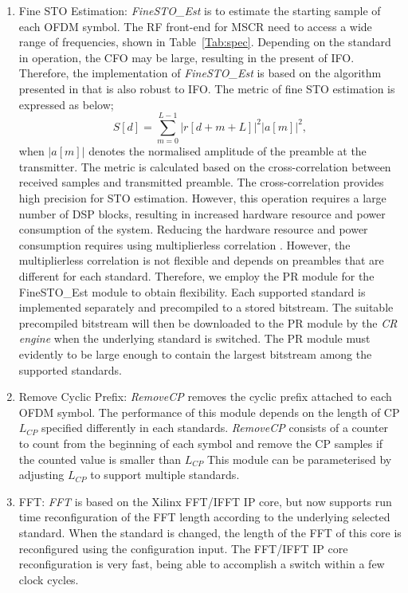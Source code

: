 \begin{enumerate}
\item{Fine STO Estimation:}
\emph{FineSTO\_Est} is to estimate the starting sample of each OFDM symbol. 
The RF front-end for MSCR need to access a wide range of frequencies, shown in Table~\ref{Tab:spec}. Depending on the standard in operation, the CFO may be large, resulting in the present of IFO.
Therefore, the implementation of \emph{FineSTO\_Est} is based on the algorithm presented in \cite{Pham2014} that is also robust to IFO.
The metric of fine STO estimation is expressed as below;
\begin{equation}
\label{ProposedR}
S[d] =\sum_{m =0}^{L-1}   |r[d+m+L]|^2  |a[m]|^2,
\end{equation}
when $|a[m]|$ denotes the normalised amplitude of the preamble at the transmitter.
The metric is calculated based on the cross-correlation between received samples and transmitted preamble.
The cross-correlation provides high precision for STO estimation. 
However, this operation requires a large number of DSP blocks, resulting in increased hardware resource and power consumption of the system.
Reducing the hardware resource and power consumption requires using multiplierless correlation \cite{Pham2012}.
However, the multiplierless correlation is not flexible and depends on preambles that are different for each standard.
Therefore, we employ the PR module for the {FineSTO\_Est} module to obtain flexibility.
Each supported standard is implemented separately and precompiled to a stored bitstream.
The suitable precompiled bitstream will then be downloaded to the PR module by the \emph{CR engine} when the underlying standard is switched.
The PR module must evidently to be large enough to contain the largest bitstream among the supported standards.

\item{Remove Cyclic Prefix:}
\emph{RemoveCP} removes the cyclic prefix attached to each OFDM symbol.
The performance of this module depends on the length of CP $L_{CP}$ specified differently in each standards.
\emph{RemoveCP} consists of a counter to count from the beginning of each symbol and remove the CP samples if the counted value is smaller than $L_{CP}$
This module can be parameterised by adjusting $L_{CP}$ to support multiple standards.

\item{FFT:}
\emph{FFT} is based on the Xilinx FFT/IFFT IP core, but now supports run time reconfiguration of the FFT length according to the underlying selected standard. When the standard is changed, the length of the FFT of this core is reconfigured using the configuration input. The FFT/IFFT IP core reconfiguration is very fast, being able to accomplish a switch within a few clock cycles.


\end{enumerate}
